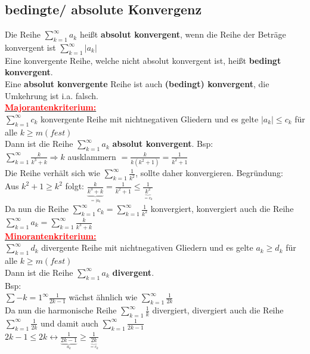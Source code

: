 \documentclass[12pt,a4paper]{article}
\begin{document}
\subsection{bedingte/ absolute Konvergenz}
Die Reihe $\sum\limits_{k=1}^{\infty}a_k$ heißt \textbf{absolut konvergent}, wenn die Reihe der Beträge konvergent ist $\sum\limits_{k=1}^{\infty}|a_k|$
\\
Eine konvergente Reihe, welche nicht absolut konvergent ist, heißt \textbf{bedingt konvergent}.
\\Eine \textbf{absolut konvergente} Reihe ist auch \textbf{(bedingt) konvergent}, die Umkehrung ist i.a. falsch.
\\\underline{\textbf{\textcolor{red}{Majorantenkriterium:}}}\\
$\sum\limits_{k=1}^{\infty}c_k$ konvergente Reihe mit nichtnegativen Gliedern und es gelte $|a_k|\leq c_k$ für alle $k\geq m (fest)$\\
Dann ist die Reihe $\sum\limits_{k=1}^{\infty}a_k$ \textbf{absolut konvergent}.
Bsp:\\
$\sum\limits_{k=1}^{\infty}\frac{k}{k^3+k} \Rightarrow k$ ausklammern $= \frac{k}{k(k^2+1)}=\frac{1}{k^2+1}$
\\Die Reihe verhält sich wie $\sum\limits_{k=1}^{\infty}\frac{1}{k^2}$, sollte daher konvergieren. Begründung:
\\Aus $k^2+1 \geq k^2$ folgt: $\frac{k}{\underbrace{k^3+k}_{=|a_k}}=\frac{1}{k^2+1}\leq \frac{1}{\underbrace{k^2}_{=c_k}}$ 
\\Da nun die Reihe $\sum\limits_{k=1}^{\infty}c_k=\sum\limits_{k=1}^{\infty}\frac{1}{k^2}$ konvergiert, konvergiert auch die Reihe $\sum\limits_{k=1}^{\infty}a_k=\sum\limits_{k=1}^{\infty}\frac{k}{k^3+k}$
\\\underline{\textbf{\textcolor{red}{Minorantenkriterium:}}}\\
$\sum\limits_{k=1}^{\infty}d_k$ divergente Reihe mit nichtnegativen Gliedern und es gelte $a_k\geq d_k$ für alle $k\geq m (fest)$\\
Dann ist die Reihe $\sum\limits_{k=1}^{\infty}a_k$ \textbf{divergent}.
\\Bsp:\\
$\sum\limits-{k=1}^{\infty}\frac{1}{2k-1}$ wächst ähnlich wie $\sum\limits_{k=1}^{\infty}\frac{1}{2k}$\\
Da nun die harmonische Reihe $\sum\limits_{k=1}^{\infty}\frac{1}{k}$ divergiert, divergiert auch die Reihe $\sum\limits_{k=1}^{\infty}\frac{1}{2k}$ und damit auch $\sum\limits_{k=1}^{\infty}\frac{1}{2k-1}$
\\$2k-1\leq 2k \leftrightarrow \frac{1}{\underbrace{2k-1}_{a_k}}\geq \frac{1}{\underbrace{2k}_{=c_k}}$
\end{document}
